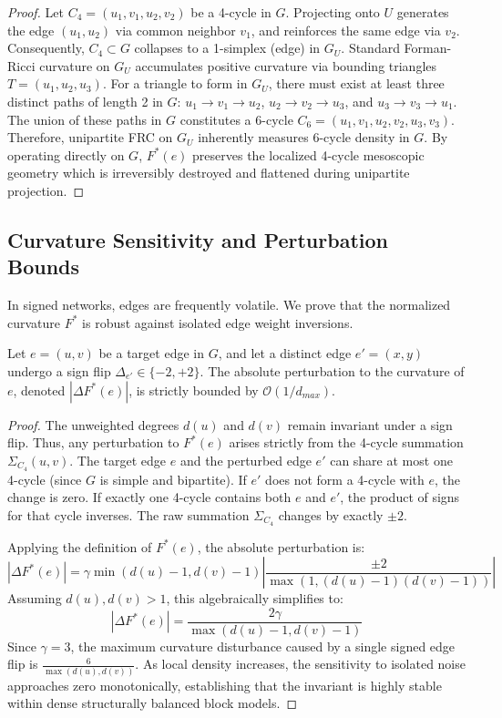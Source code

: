 \documentclass{siuro250211}
\begin{document}
\begin{proof}
Let $C_4 = (u_1, v_1, u_2, v_2)$ be a 4-cycle in $G$. Projecting onto $U$ generates the edge $(u_1, u_2)$ via common neighbor $v_1$, and reinforces the same edge via $v_2$. Consequently, $C_4 \subset G$ collapses to a 1-simplex (edge) in $G_U$. Standard Forman-Ricci curvature on $G_U$ accumulates positive curvature via bounding triangles $T = (u_1, u_2, u_3)$. For a triangle to form in $G_U$, there must exist at least three distinct paths of length 2 in $G$: $u_1 \to v_1 \to u_2$, $u_2 \to v_2 \to u_3$, and $u_3 \to v_3 \to u_1$. The union of these paths in $G$ constitutes a 6-cycle $C_6 = (u_1, v_1, u_2, v_2, u_3, v_3)$. Therefore, unipartite FRC on $G_U$ inherently measures 6-cycle density in $G$. By operating directly on $G$, $F^*(e)$ preserves the localized 4-cycle mesoscopic geometry which is irreversibly destroyed and flattened during unipartite projection.
\end{proof}

\subsection{Curvature Sensitivity and Perturbation Bounds}
In signed networks, edges are frequently volatile. We prove that the normalized curvature $F^*$ is robust against isolated edge weight inversions.

\begin{theorem}
Let $e = (u,v)$ be a target edge in $G$, and let a distinct edge $e' = (x,y)$ undergo a sign flip $\Delta_{e'} \in \{-2, +2\}$. The absolute perturbation to the curvature of $e$, denoted $|\Delta F^*(e)|$, is strictly bounded by $\mathcal{O}(1/d_{max})$.
\end{theorem}

\begin{proof}
The unweighted degrees $d(u)$ and $d(v)$ remain invariant under a sign flip. Thus, any perturbation to $F^*(e)$ arises strictly from the 4-cycle summation $\Sigma_{C_4}(u,v)$. The target edge $e$ and the perturbed edge $e'$ can share at most one 4-cycle (since $G$ is simple and bipartite). If $e'$ does not form a 4-cycle with $e$, the change is zero. If exactly one 4-cycle contains both $e$ and $e'$, the product of signs for that cycle inverses. The raw summation $\Sigma_{C_4}$ changes by exactly $\pm 2$.

Applying the definition of $F^*(e)$, the absolute perturbation is:
\begin{equation}
|\Delta F^*(e)| = \gamma \min(d(u)-1, d(v)-1) \left| \frac{\pm 2}{\max(1, (d(u)-1)(d(v)-1))} \right|
\end{equation}
Assuming $d(u), d(v) > 1$, this algebraically simplifies to:
\begin{equation}
|\Delta F^*(e)| = \frac{2\gamma}{\max(d(u)-1, d(v)-1)}
\end{equation}
Since $\gamma = 3$, the maximum curvature disturbance caused by a single signed edge flip is $\frac{6}{\max(d(u), d(v))}$. As local density increases, the sensitivity to isolated noise approaches zero monotonically, establishing that the invariant is highly stable within dense structurally balanced block models.
\end{proof}
\end{document}
